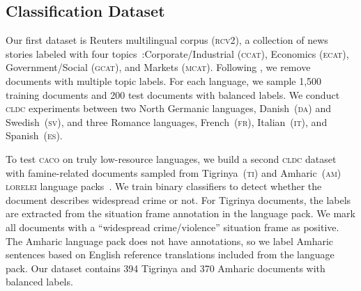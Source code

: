 \documentclass[letterpaper]{article} %
\newcommand{\citet}[1]{\citeauthor{#1} \shortcite{#1}}
\newcommand{\citep}{\cite}
\newcommand{\abr}[1]{\textsc{#1}}
\newcommand{\name}[0]{\textsc{caco}}
\begin{document}
\subsection{Classification Dataset}

Our first dataset is Reuters multilingual corpus (\abr{rcv2}), a collection of
news stories labeled with four topics~\citep{lewis-04}:Corporate/Industrial
(\abr{ccat}), Economics (\abr{ecat}), Government/Social (\abr{gcat}), and
Markets (\abr{mcat}).
Following \citet{klementiev-12}, we remove documents with multiple topic
labels.  For each language, we sample 1,500 training documents and 200 test
documents with balanced labels.  We conduct \abr{cldc} experiments between two
North Germanic languages, Danish~(\abr{da}) and Swedish~(\abr{sv}), and three
Romance languages, French~(\abr{fr}), Italian~(\abr{it}), and
Spanish~(\abr{es}).

To test \name{} on truly low-resource languages, we build a second \abr{cldc}
dataset with famine-related documents sampled from Tigrinya~(\abr{ti}) and
Amharic~(\abr{am}) \abr{lorelei} language packs~\citep{strassel-16}.
We train binary classifiers to detect whether the document describes widespread
crime or not.  For Tigrinya documents, the labels are extracted from the
situation frame annotation in the language pack.  We mark all documents with a
``widespread crime/violence'' situation frame as positive.  The Amharic
language pack does not have annotations, so we label Amharic sentences
based on English reference translations included from the language pack.
Our dataset contains 394 Tigrinya and 370 Amharic documents with balanced
labels.
\end{document}
